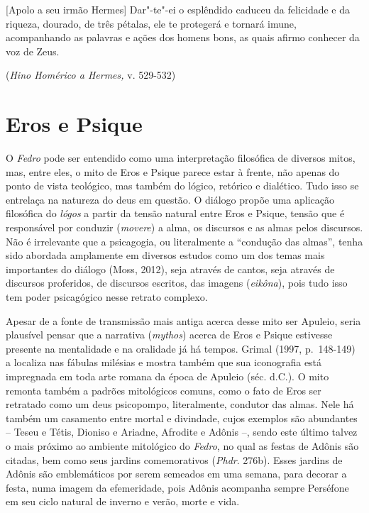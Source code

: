 
\epigraph{[Apolo a seu irmão Hermes] Dar"-te"-ei o esplêndido caduceu da felicidade e da riqueza, dourado, de
três pétalas, ele te protegerá e tornará imune, acompanhando as
palavras e ações dos homens bons, as quais afirmo conhecer da voz de
Zeus.}{(\emph{Hino Homérico a Hermes,} v. 529-532)} 


\section{Eros e Psique}
 

O \emph{Fedro} pode ser entendido como uma interpretação filosófica de
diversos mitos, mas, entre eles, o mito de Eros e Psique parece estar à
frente, não apenas do ponto de vista teológico, mas também do lógico, retórico e dialético. Tudo isso se entrelaça na natureza
do deus em questão. O diálogo propõe uma aplicação filosófica
do \emph{lógos} a partir da tensão natural entre Eros e Psique, tensão
que é responsável por conduzir (\emph{movere}) a alma, os discursos e as almas
pelos discursos. Não é irrelevante que a psicagogia, ou
literalmente a ``condução das almas'', tenha sido abordada amplamente em
diversos estudos como um dos temas mais importantes do diálogo (Moss, 2012), seja através de cantos, seja através de discursos proferidos, de
discursos escritos, das imagens (\emph{eikôna}), pois tudo isso tem
poder psicagógico nesse retrato complexo.

Apesar de a fonte de transmissão mais antiga acerca desse mito ser
Apuleio, seria plausível pensar que a narrativa (\emph{mythos}) acerca de Eros e
Psique estivesse presente na mentalidade e na oralidade já há tempos.
Grimal (1997, p.~148-149) a localiza nas fábulas milésias e
mostra também que sua iconografia está impregnada em toda arte romana da
época de Apuleio (séc.  d.C.). O mito remonta também a padrões
mitológicos comuns, como o fato de Eros ser retratado como um deus psicopompo,
literalmente, condutor das almas. Nele há também um casamento entre
mortal e divindade, cujos exemplos são abundantes -- Teseu e Tétis,
Dioniso e Ariadne, Afrodite e Adônis --, sendo este último talvez o mais
próximo ao ambiente mitológico do \emph{Fedro}, no qual as festas de
Adônis são citadas, bem como seus jardins comemorativos
(\emph{Phdr}. 276b). Esses jardins de Adônis são emblemáticos por serem
semeados em uma semana, para decorar a festa, numa imagem da
efemeridade, pois Adônis acompanha sempre Perséfone em seu ciclo natural de
inverno e verão, morte e vida.

